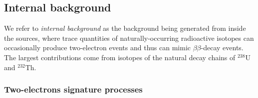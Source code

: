 \subsection{Internal background}
\label{subsec:SNbkg_internal}

We refer to \emph{internal background} as the background being generated from inside the sources, where trace quantities of naturally-occurring radioactive isotopes can occasionally produce two-electron events and thus can mimic $\beta\beta$-decay events.
The largest contributions come from isotopes of the natural decay chains of $^{238}$U and $^{232}$Th.

\subsubsection*{Two-electrons signature processes}

